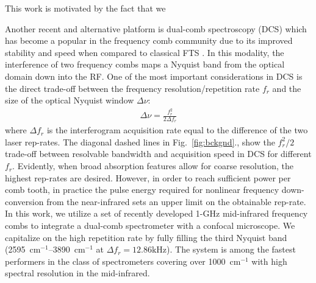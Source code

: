 \documentclass{optica-article}
\begin{document}




This work is motivated by the fact that we 

Another recent and alternative platform is dual-comb spectroscopy (DCS) which has become a popular in the frequency comb community due to its improved stability and speed when compared to classical FTS \cite{coddingtonDualcombSpectroscopy2016}. In this modality, the interference of two frequency combs maps a Nyquist band from the optical domain down into the RF. One of the most important considerations in DCS is the direct trade-off between the frequency resolution/repetition rate $f_r$ and the size of the optical Nyquist window $\Delta \nu$:
% 
\begin{align}
    \Delta \nu = \frac{f_r^2}{2 \Delta f_r}
\end{align}
% 
where $\Delta f_r$ is the interferogram acquisition rate equal to the difference of the two laser rep-rates. The diagonal dashed lines in \mbox{Fig. \ref{fig:bckgnd}}., show the $f_r^2/2$ trade-off between resolvable bandwidth and acquisition speed in DCS for different $f_r$. Evidently, when broad absorption features allow for coarse resolution, the highest rep-rates are desired. However, in order to reach sufficient power per comb tooth, in practice the pulse energy required for nonlinear frequency down-conversion from the near-infrared sets an upper limit on the obtainable rep-rate. In this work, we utilize a set of recently developed 1-GHz mid-infrared frequency combs \cite{hoghooghiBroadband1GHzMidinfrared2022} to integrate a dual-comb spectrometer with a confocal microscope. We capitalize on the high repetition rate by fully filling the third Nyquist band (\mbox{2595 $\mathrm{cm^{-1}}$}--\mbox{3890 $\mathrm{cm^{-1}}$} at \mbox{$\Delta f_r=12.86\text{kHz}$}). The system is among the fastest performers in the class of spectrometers covering over \mbox{1000 $\mathrm{cm^{-1}}$} with high spectral resolution in the mid-infrared.
\end{document}
